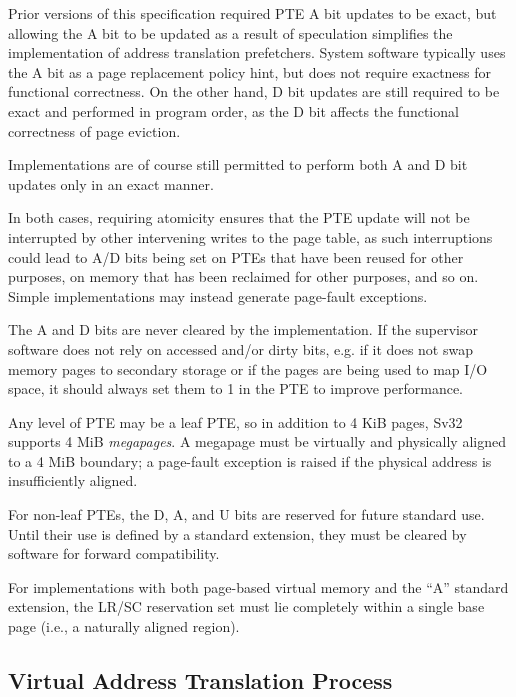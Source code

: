 \begin{commentary}
Prior versions of this specification required PTE A bit updates to be exact,
but allowing the A bit to be updated as a result of speculation simplifies
the implementation of address translation prefetchers.  System software
typically uses the A bit as a page replacement policy hint, but does not
require exactness for functional correctness.  On the other hand, D bit updates
are still required to be exact and performed in program order, as the D bit
affects the functional correctness of page eviction.

Implementations are of course still permitted to perform both A and D bit
updates only in an exact manner.

In both cases, requiring atomicity ensures that the PTE update will not be
interrupted by other intervening writes to the page table, as such interruptions
could lead to A/D bits being set on PTEs that have been reused for other
purposes, on memory that has been reclaimed for other purposes, and so on.
Simple implementations may instead generate page-fault exceptions.

The A and D bits are never cleared by the implementation.  If the
supervisor software does not rely on accessed and/or dirty bits,
e.g. if it does not swap memory pages to secondary storage or if the
pages are being used to map I/O space, it should always set them to 1
in the PTE to improve performance.
\end{commentary}

Any level of PTE may be a leaf PTE, so in addition to 4 KiB pages, Sv32
supports 4 MiB {\em megapages}.  A megapage must be virtually and
physically aligned to a 4 MiB boundary; a page-fault exception is raised
if the physical address is insufficiently aligned.

For non-leaf PTEs, the D, A, and U bits are reserved for future standard
use.  Until their use is defined by a standard extension, they
must be cleared by software for forward compatibility.

For implementations with both page-based virtual memory and the ``A'' standard
extension, the LR/SC reservation set must lie completely within a single
base page (i.e., a naturally aligned  region).

\subsection{Virtual Address Translation Process}
\label{sv32algorithm}

